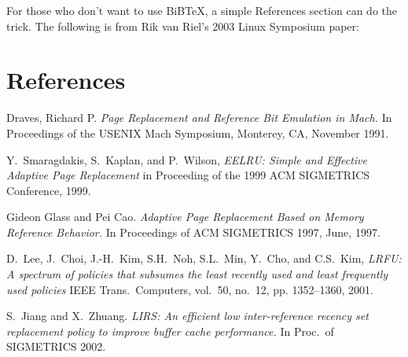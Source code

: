 
For those who don't want to use BiBTeX, a simple References section
can do the trick.  The following is from Rik van Riel's 2003
Linux Symposium paper:

\section{References}
\raggedright
Draves, Richard P. \textit{Page Replacement and Reference Bit
Emulation in Mach.} In Proceedings of the USENIX Mach Symposium,
Monterey, CA, November 1991. 

Y.\ Smaragdakis, S.\ Kaplan, and P.\ Wilson, \textit{EELRU: Simple and
Effective Adaptive Page Replacement} in Proceeding of the 1999 ACM
SIGMETRICS Conference, 1999. 

Gideon Glass and Pei Cao. \textit{Adaptive Page Replacement Based on
Memory Reference Behavior.} In Proceedings of ACM SIGMETRICS 1997,
June, 1997. 

D.\ Lee, J.\ Choi, J.-H.\ Kim, S.H.\ Noh, S.L.\ Min, Y.\ Cho, and
C.S.\ Kim, \textit{LRFU: A spectrum of policies that subsumes the
least recently used and least frequently used policies} IEEE
Trans.\ Computers, vol.\ 50, no.\ 12, pp. 1352--1360, 2001. 

S.\ Jiang and X.\ Zhuang. \textit{LIRS: An efficient low inter-reference
recency set replacement policy to improve buffer cache performance.}
In Proc.\ of SIGMETRICS 2002. 


